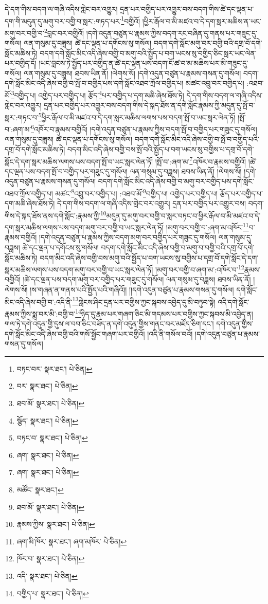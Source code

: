 དེ་དག་གིས་བདག་ལ་གཞི་འདིས་གླེང་བར་འགྱུར། དྲན་པར་བགྱིད་པར་འགྱུར་བས་བདག་གིས་ཚེ་དང་ལྡན་པ་དག་གི་མདུན་དུ་མགུ་བར་བགྱི་བ་སླར་:གཏད་པར་\footnote{བཏང་བར་  སྣར་ཐང་།  པེ་ཅིན། }བགྱིའོ། །ཕྱིར་རྒོལ་བ་མི་མཛའ་བ་དེ་དག་སླར་མཆིས་ན་ཡང་མགུ་བར་བགྱི་བ་\footnote{བར་  སྣར་ཐང་།  པེ་ཅིན། }བླང་བར་བགྱིའོ། །དགེ་འདུན་བཙུན་པ་རྣམས་ཀྱིས་བདག་རང་བཞིན་དུ་གནས་པར་གཟུང་དུ་གསོལ། ལན་གསུམ་དུ་བཟླས། ཚེ་དང་ལྡན་པ་དགོངས་སུ་གསོལ། བདག་དགེ་སློང་མགུ་བར་བགྱི་བའི་དགྲ་བོ་དགེ་སློང་མཆིས་ཏེ། བདག་དགེ་སློང་མིང་འདི་ཞེས་བགྱི་བ་མགུ་བའི་སྤྱོད་པ་བག་ཡངས་སུ་བགྱིད་ཅིང་སླར་ཡང་ལེན་པར་བགྱིད་དོ། །ཡང་བླངས་ཏེ་སྤྱོད་པར་བགྱིད་ན་ཚེ་དང་ལྡན་པས་བདག་ངོ་ཚ་བ་མ་མཆིས་པར་མི་གཟུང་དུ་གསོལ། ལན་གསུམ་དུ་བཟླས། ཐབས་ཡིན་ནོ། །ལེགས་སོ། །དགེ་འདུན་བཙུན་པ་རྣམས་གསན་དུ་གསོལ། བདག་དགེ་སློང་མིང་འདི་ཞེས་བགྱི་བ་སྤོ་བ་བགྱིད་པས་དགེ་སློང་འཐབ་ཀྲོལ་བགྱིད་པ། མཚང་འབྲུ་བར་བགྱིད་པ། :འཐབ་མོ་\footnote{ཐབ་མོ་  སྣར་ཐང་།  པེ་ཅིན། }བགྱིད་པ། འགྱེད་པར་བགྱིད་པ། རྩོད་\footnote{སྩོད་  སྣར་ཐང་།  པེ་ཅིན། }པར་བགྱིད་པ་དག་མཆི་ཞེས་ཐོས་ཏེ། དེ་དག་གིས་བདག་ལ་གཞི་འདིས་གླེང་བར་འགྱུར། དྲན་པར་བགྱིད་པར་འགྱུར་བས་བདག་གིས་དེ་སྐད་ཐོས་ན་དགེ་སློང་རྣམས་ཀྱི་མདུན་དུ་སྤོ་བ་སླར་:གཏང་བ་\footnote{བཏང་བ་  སྣར་ཐང་།  པེ་ཅིན། }ཕྱིར་རྒོལ་བ་མི་མཛའ་བ་དེ་དག་སླར་མཆིས་ལགས་པས་བདག་སྤོ་བ་ཡང་སླར་ལེན་ཏོ། །སྤོ་བ་:ཞག་མ་\footnote{ཞག་  སྣར་ཐང་།  པེ་ཅིན། }འཁོར་བ་རྣམས་བགྱིའོ། །དགེ་འདུན་བཙུན་པ་རྣམས་ཀྱིས་བདག་སྤོ་བ་བགྱིད་པར་གཟུང་དུ་གསོལ། ལན་གསུམ་དུ་བཟླས། ཚེ་དང་ལྡན་པ་དགོངས་སུ་གསོལ། བདག་དགེ་སློང་མིང་འདི་ཞེས་བགྱི་བ་སྤོ་བ་བགྱིད་པའི་དགྲ་བོ་དགེ་སློང་མཆིས་ཏེ། བདག་མིང་འདི་ཞེས་བགྱི་བས་སྤོ་བའི་སྤྱོད་པ་བག་ཡངས་སུ་བགྱིས་པ་དགྲ་བོ་དགེ་སློང་དེ་དག་སླར་མཆིས་ལགས་པས་བདག་སྤོ་བ་ཡང་སླར་ལེན་ཏོ། །སྤོ་བ་:ཞག་མ་\footnote{ཞག་  སྣར་ཐང་།  པེ་ཅིན། }འཁོར་བ་རྣམས་བགྱིའོ། །ཚེ་དང་ལྡན་པས་བདག་སྤོ་བ་བགྱིད་པར་གཟུང་དུ་གསོལ། ལན་གསུམ་དུ་བཟླས། ཐབས་ཡིན་ནོ། །ལེགས་སོ། །དགེ་འདུན་བཙུན་པ་རྣམས་གསན་དུ་གསོལ། བདག་དགེ་སློང་མིང་འདི་ཞེས་བགྱི་བ་མགུ་བར་བགྱིད་པས་དགེ་སློང་འཐབ་ཀྲོལ་བགྱིད་པ། མཚང་\footnote{མཚོང་  སྣར་ཐང་། }འབྲུ་བར་བགྱིད་པ། :འཐབ་མོ་\footnote{ཐབ་མོ་  སྣར་ཐང་།  པེ་ཅིན། }བགྱིད་པ། འགྱེད་པར་བགྱིད་པ། རྩོད་པར་བགྱིད་པ་དག་མཆི་ཞེས་ཐོས་ཏེ། དེ་དག་གིས་བདག་ལ་གཞི་འདིས་གླེང་བར་འགྱུར། དྲན་པར་བགྱིད་པར་འགྱུར་བས། བདག་གིས་དེ་སྐད་ཐོས་ནས་དགེ་སློང་:རྣམས་ཀྱི་\footnote{རྣམས་ཀྱིས་  སྣར་ཐང་།  པེ་ཅིན། }མདུན་དུ་མགུ་བར་བགྱི་བ་སླར་བཏང་བ་ཕྱིར་རྒོལ་བ་མི་མཛའ་བ་དེ་དག་སླར་མཆིས་ལགས་པས་བདག་མགུ་བར་བགྱི་བ་ཡང་སླར་ལེན་ཏོ། །མགུ་བར་བགྱི་བ་:ཞག་མ་འཁོར་\footnote{ཞག་མི་ཁོར་  སྣར་ཐང་། ཞག་མཁོར་  པེ་ཅིན། }བ་རྣམས་བགྱིའོ། །དགེ་འདུན་བཙུན་པ་རྣམས་ཀྱིས་བདག་མགུ་བར་བགྱིད་པར་གཟུང་དུ་གསོལ། ལན་གསུམ་དུ་བཟླས། ཚེ་དང་ལྡན་པ་དགོངས་སུ་གསོལ། བདག་དགེ་སློང་མིང་འདི་ཞེས་བགྱི་བ་མགུ་བ་བགྱི་བའི་དགྲ་བོ་དགེ་སློང་མཆིས་ཏེ། བདག་མིང་འདི་ཞེས་བགྱི་བས་མགུ་བའི་སྤྱོད་པ་བག་ཡངས་སུ་བགྱིས་པ་དགྲ་བོ་དགེ་སློང་དེ་དག་སླར་མཆིས་ལགས་པས་བདག་མགུ་བར་བགྱི་བ་ཡང་སླར་ལེན་ཏོ། །མགུ་བར་བགྱི་བ་ཞག་མ་:འཁོར་བ་\footnote{ཁོར་བ་  སྣར་ཐང་།  པེ་ཅིན། }རྣམས་བགྱིའོ། །ཚེ་དང་ལྡན་པས་བདག་མགུ་བར་བགྱིད་པར་གཟུང་དུ་གསོལ། ལན་གསུམ་དུ་བཟླས། ཐབས་ཡིན་ནོ། །ལེགས་སོ། །ས་གཞན་ན་གནས་པའི་སྤྱོད་པའི་གཞིའོ།། །།དགེ་འདུན་བཙུན་པ་རྣམས་གསན་དུ་གསོལ། དགེ་སློང་མིང་འདི་ཞེས་བགྱི་བ་:འདི་ནི་\footnote{འདི་  སྣར་ཐང་།  པེ་ཅིན། }གླེངས་ཤིང་དྲན་པར་བགྱིས་ཀྱང་སྐབས་འབྱེད་དུ་མི་བཏུབ་སྟེ། འདི་དགེ་སློང་རྣམས་ཀྱིས་སྨྲ་བར་མི་:བགྱི་བ་\footnote{བགྱིད་པ་  སྣར་ཐང་།  པེ་ཅིན། }ཉིད་དུ་རྣམ་པར་གཞག་ཅིང་མི་གདམས་པར་བགྱིས་ཀྱང་སྐབས་མི་འབྱེད་ན། གལ་ཏེ་དགེ་འདུན་གྱི་དུས་ལ་བབ་ཅིང་བཟོད་ན་དགེ་འདུན་གྱིས་གནང་བར་མཛོད་ཅིག་དང་། དགེ་འདུན་གྱིས་དགེ་སློང་མིང་འདི་ཞེས་བགྱི་བའི་གསོ་སྦྱོང་གཞག་པར་བགྱིའོ། །འདི་ནི་གསོལ་བའོ། །དགེ་འདུན་བཙུན་པ་རྣམས་གསན་དུ་གསོལ། 